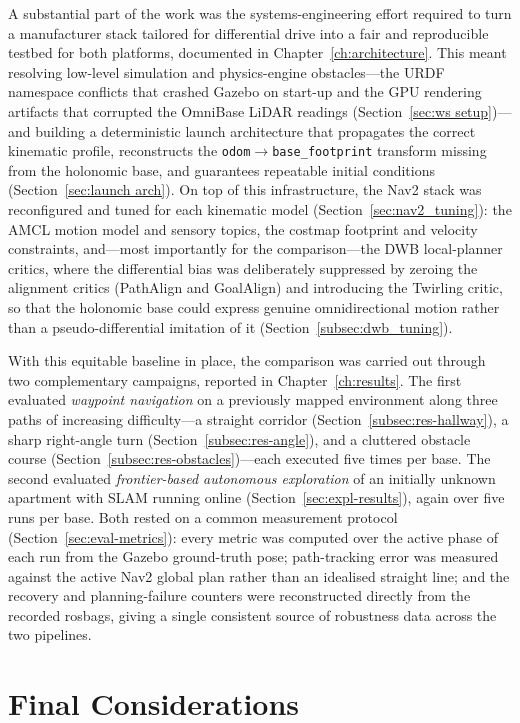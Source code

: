 A substantial part of the work was the systems-engineering effort required to turn a manufacturer stack tailored for differential drive into a fair and reproducible testbed for both platforms, documented in Chapter~\ref{ch:architecture}. This meant resolving low-level simulation and physics-engine obstacles---the URDF namespace conflicts that crashed Gazebo on start-up and the GPU rendering artifacts that corrupted the OmniBase LiDAR readings (Section~\ref{sec:ws setup})---and building a deterministic
launch architecture that propagates the correct kinematic profile, reconstructs the \texttt{odom}$\rightarrow$\texttt{base\_footprint} transform missing from the holonomic base, and guarantees repeatable initial conditions (Section~\ref{sec:launch arch}). On top of this infrastructure, the Nav2 stack was reconfigured and tuned for each kinematic model (Section~\ref{sec:nav2_tuning}): the AMCL motion model and sensory topics, the costmap footprint and velocity constraints, and---most importantly for the comparison---the DWB local-planner critics, where the differential bias was deliberately suppressed by zeroing the alignment critics (PathAlign and GoalAlign) and introducing the Twirling critic, so that the holonomic base could express genuine omnidirectional motion rather than a pseudo-differential imitation of it (Section~\ref{subsec:dwb_tuning}).

With this equitable baseline in place, the comparison was carried out through two complementary campaigns, reported in Chapter~\ref{ch:results}. The first evaluated \emph{waypoint navigation} on a previously mapped environment along three paths of increasing difficulty---a straight corridor (Section~\ref{subsec:res-hallway}), a sharp right-angle turn (Section~\ref{subsec:res-angle}), and a cluttered obstacle course (Section~\ref{subsec:res-obstacles})---each executed five times per base. The second evaluated \emph{frontier-based autonomous exploration} of an initially unknown apartment with SLAM running online (Section~\ref{sec:expl-results}), again over five runs per base. Both rested on a common measurement protocol (Section~\ref{sec:eval-metrics}): every metric was computed over the active phase of each run from the Gazebo ground-truth pose; path-tracking error was measured against the active Nav2 global plan rather than an idealised straight line; and the recovery and planning-failure counters were reconstructed directly from the recorded rosbags, giving a single consistent source of robustness data across the two pipelines.

\section{Final Considerations}
\label{sec:conclusions_final}

